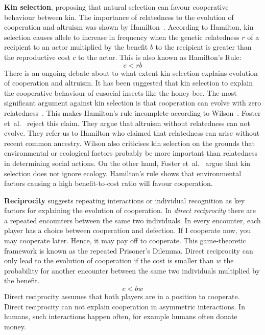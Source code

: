 \documentclass{article}
\begin{document}
\textbf{Kin selection}, proposing that natural selection can favour cooperative behaviour between kin. The importance of relatedness to the evolution of cooperation and altruism was shown by Hamilton~\cite{hamilton1964genetical}. According to Hamilton, kin selection causes allele to increase in frequency when the genetic relatedness $r$ of a recipient to an actor multiplied by the benefit $b$ to the recipient is greater than the reproductive cost $c$ to the actor. This is also known as Hamilton's Rule:
\begin{equation} \label{hamiltonrule}
c<rb
\end{equation}
There is an ongoing debate about to what extent kin selection explains evolution of cooperation and altruism.
It has been suggested that kin selection to explain the cooperative behaviour of eusocial insects like the honey bee.
The most significant argument against kin selection is that cooperation can evolve with zero relatedness~\cite{wilson2005kin}. This makes Hamilton's rule incomplete according to Wilson~\cite{wilson2005kin}. Foster et~al.~\cite{foster2006kin} reject this claim. They argue that altruism without relatedness can not evolve. They refer us to Hamilton who claimed that relatedness can arise without recent common ancestry. 
Wilson also criticises kin selection on the grounds that environmental or ecological factors probably be more important than relatedness in determining social actions. On the other hand, Foster et~al.~\cite{foster2006kin} argue that kin selection does not ignore ecology. Hamilton’s rule shows
that environmental factors causing a high benefit-to-cost ratio will favour cooperation.

\textbf{Reciprocity} suggests repeating interactions or individual recognition as key factors for explaining the evolution of cooperation. In \textit{direct reciprocity} there are a repeated encounters between the same two individuals. In every encounter, each player has a choice between cooperation and defection. If I cooperate now, you may cooperate later. Hence, it may pay off to cooperate.
This game-theoretic framework is known as the repeated Prisoner's Dilemma. 
Direct reciprocity can only lead to the evolution of cooperation if the cost is smaller than $w$ the probability for another encounter between the same two individuals multiplied by the benefit. 
\begin{equation} \label{reciprocity}
c<bw
\end{equation}
Direct reciprocity assumes that both players are in a position to cooperate. Direct reciprocity can not explain cooperation in asymmetric interactions. In humans, such interactions happen often, for example humans often donate money. 
\end{document}
